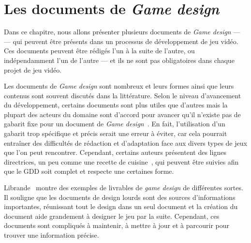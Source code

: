 \chapter{Les documents de \emph{Game design}}

\label{chap.design_doc}

Dans ce chapitre, nous allons pr\'esenter plusieurs documents de \emph{Game design} ---  --- qui peuvent être présents dans un processus de développement de jeu vidéo.
Ces documents peuvent être rédigés l'un à la suite de l'autre, ou indépendamment l'un de l'autre --- et ils ne sont pas obligatoires dans chaque projet de jeu vidéo.



Les documents de \emph{Game design} sont nombreux et leurs formes ainsi que leurs contenus sont souvent discut\'es dans la littérature.
Selon le niveau d'avancement du développement, certains documents sont plus utiles que d'autres mais la plupart des acteurs du domaine sont d'accord pour avancer qu'il n'existe pas de gabarit fixe pour un document de \emph{Game design}~\cite{GD_theory_rouse}.
En fait, l'utilisation d'un gabarit trop sp\'ecifique et précis serait une erreur à \'eviter, car cela pourrait entraîner des difficultés de rédaction et d'adaptation face aux divers types de jeux que l'on peut rencontrer.
Cependant, certains auteurs présentent des lignes directrices, un peu comme une recette de cuisine~\cite{LevelUpRogers2014}, qui peuvent être suivies afin que le GDD soit complet et respecte une certaines forme. 

Librande~\cite{onepage_librande} montre des exemples de livrables de \emph{game design} de différentes sortes.
Il souligne que les documents de design lourds sont des sources d'informations importantes, réunissant tout le design dans un seul document et la création du document aide grandement à designer le jeu par la suite.
Cependant, ces documents sont compliqués à maintenir, \`a mettre à jour et à parcourir pour trouver une information précise.



